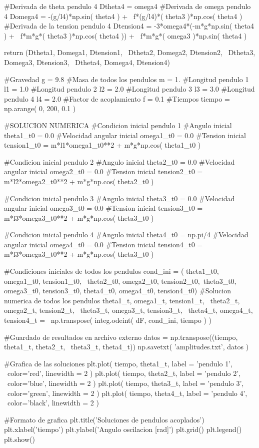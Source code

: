 \begin{listing}[style=python]
    #Derivada de theta pendulo 4
    Dtheta4 = omega4
    #Derivada de omega pendulo 4
    Domega4 = -(g/l4)*np.sin( theta4 ) + \
    f*(g/l4)*( theta3 )*np.cos( theta4 )
    #Derivada de la tension pendulo 4
    Dtension4 = -3*omega4*(-m*g*np.sin( theta4 ) + \
    f*m*g*( theta3 )*np.cos( theta4 )) + \
    f*m*g*( omega3 )*np.sin( theta4 )
    
    return (Dtheta1, Domega1, Dtension1, \
    Dtheta2, Domega2, Dtension2, \
    Dtheta3, Domega3, Dtension3, \
    Dtheta4, Domega4, Dtension4)
    
#Gravedad
g = 9.8
#Masa de todos los pendulos
m = 1.
#Longitud pendulo 1
l1 = 1.0
#Longitud pendulo 2
l2 = 2.0
#Longitud pendulo 3
l3 = 3.0
#Longitud pendulo 4
l4 = 2.0
#Factor de acoplamiento 
f = 0.1
#Tiempos
tiempo = np.arange( 0, 200, 0.1 )
    

#SOLUCION NUMERICA
#Condicion inicial pendulo 1
#Angulo inicial
theta1_t0 = 0.0
#Velocidad angular inicial
omega1_t0 = 0.0
#Tension inicial
tension1_t0 = m*l1*omega1_t0**2 + m*g*np.cos( theta1_t0 )

#Condicion inicial pendulo 2
#Angulo inicial
theta2_t0 = 0.0
#Velocidad angular inicial
omega2_t0 = 0.0
#Tension inicial
tension2_t0 = m*l2*omega2_t0**2 + m*g*np.cos( theta2_t0 )

#Condicion inicial pendulo 3
#Angulo inicial
theta3_t0 = 0.0
#Velocidad angular inicial
omega3_t0 = 0.0
#Tension inicial
tension3_t0 = m*l3*omega3_t0**2 + m*g*np.cos( theta3_t0 )

#Condicion inicial pendulo 4
#Angulo inicial
theta4_t0 = np.pi/4
#Velocidad angular inicial
omega4_t0 = 0.0
#Tension inicial
tension4_t0 = m*l3*omega3_t0**2 + m*g*np.cos( theta3_t0 )

#Condiciones iniciales de todos los pendulos
cond_ini = ( theta1_t0, omega1_t0, tension1_t0, \
theta2_t0, omega2_t0, tension2_t0,\
theta3_t0, omega3_t0, tension3_t0,
theta4_t0, omega4_t0, tension4_t0)
#Solucion numerica de todos los pendulos
theta1_t, omega1_t, tension1_t, \
theta2_t, omega2_t, tension2_t, \
theta3_t, omega3_t, tension3_t, \
theta4_t, omega4_t, tension4_t = \
np.transpose( integ.odeint( dF, cond_ini, tiempo ) )

#Guardado de resultados en archivo externo
datos = np.transpose((tiempo, theta1_t, theta2_t, \
theta3_t, theta4_t))
np.savetxt( 'amplitudes.txt', datos )

#Grafica de las soluciones
plt.plot( tiempo, theta1_t, label = 'pendulo 1', \
color='red', linewidth = 2 )
plt.plot( tiempo, theta2_t, label = 'pendulo 2', \
color='blue', linewidth = 2 )
plt.plot( tiempo, theta3_t, label = 'pendulo 3', \
color='green', linewidth = 2 )
plt.plot( tiempo, theta4_t, label = 'pendulo 4', \
color='black', linewidth = 2 )

#Formato de grafica
plt.title('Soluciones de pendulos acoplados')
plt.xlabel('tiempo')
plt.ylabel('Angulo oscilacion [rad]')
plt.grid()
plt.legend()
plt.show()
\end{listing}


